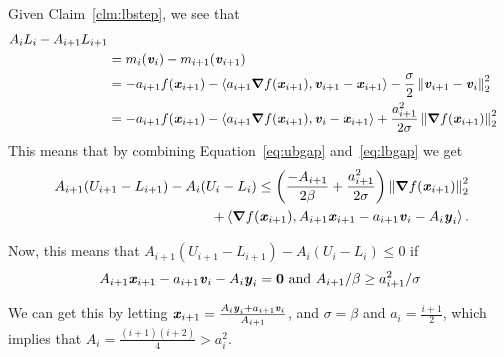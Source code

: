 Given Claim~\ref{clm:lbstep}, we see that
\begin{align}
  \nonumber
 A_iL_i-A_{i+1}L_{i+1}
\\
 &= m_{i}(\boldsymbol{\mathit{v}}_i)  - m_{i+1}(\boldsymbol{\mathit{v}}_{i+1})
 \\
 &=
-  a_{i+1}  f(\boldsymbol{\mathit{x}}_{i+1})
-  \left<  a_{i+1}\boldsymbol{\nabla}
  f(\boldsymbol{\mathit{x}}_{i+1}) ,\boldsymbol{\mathit{v}}_{i+1} - \boldsymbol{\mathit{x}}_{i+1} \right>
-
\frac{\sigma}{2} \left\|  \boldsymbol{\mathit{v}}_{i+1} -
   \boldsymbol{\mathit{v}}_i \right\|_2^2
\\
 &=
 -  a_{i+1}  f(\boldsymbol{\mathit{x}}_{i+1})
-  \left<  a_{i+1}\boldsymbol{\nabla} f(\boldsymbol{\mathit{x}}_{i+1}) ,\boldsymbol{\mathit{v}}_{i} - \boldsymbol{\mathit{x}}_{i+1} \right>
+
   \frac{a_{i+1}^2}{2\sigma} \left\|  \boldsymbol{\nabla} f(\boldsymbol{\mathit{x}}_{i+1}) \right\|_2^2
   \label{eq:lbgap}
\end{align}
This means that by combining Equation~\eqref{eq:ubgap}
and~\eqref{eq:lbgap} we get
\begin{align*}
  \
  A_{i+1}( U_{i+1} - L_{i+1})
 -
  A_{i}( U_{i} - L_{i})
  \leq
  \left(
  \frac{-A_{i+1}}{2\beta}
  +
\frac{a_{i+1}^2}{2\sigma}
  \right)
  \left\|  \boldsymbol{\nabla} f(\boldsymbol{\mathit{x}}_{i+1}) \right\|_2^2
  \\
  +  \left< \boldsymbol{\nabla} f(\boldsymbol{\mathit{x}}_{i+1}) ,
  A_{i+1} \boldsymbol{\mathit{x}}_{i+1}
  - a_{i+1} \boldsymbol{\mathit{v}}_{i}
  - A_{i} \boldsymbol{\mathit{y}}_{i} \right>
  .
\end{align*}

Now, this means that $ A_{i+1}( U_{i+1} - L_{i+1}) - A_{i}( U_{i} -
L_{i}) \leq 0$ if
\[
   A_{i+1} \boldsymbol{\mathit{x}}_{i+1}
  - a_{i+1} \boldsymbol{\mathit{v}}_{i}
  - A_{i} \boldsymbol{\mathit{y}}_{i} = \boldsymbol{0}
\text{ and }
A_{i+1}/\beta \geq  a_{i+1}^2/\sigma
\]

We can get this by letting
$\boldsymbol{\mathit{x}}_{i+1} = \frac{
A_{i} \boldsymbol{\mathit{y}}_{i} + a_{i+1} \boldsymbol{\mathit{v}}_{i}
}{A_{i+1}}
$, and $\sigma = \beta$ and $a_i = \frac{i+1}{2}$,
which implies that $A_i = \frac{(i+1)(i+2)}{4} > a_i^2$.



